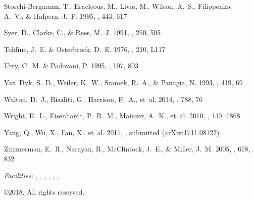 \documentclass[iop]{emulateapj}
\begin{document}
\begin{thebibliography}{84}
Storchi-Bergmann, T., Eracleous, M., Livio, M., Wilson, A.~S., Filippenko,
  A.~V., \& Halpern, J.~P. 1995, \apj, 443, 617

Syer, D., Clarke, C., \& Rees, M.~J. 1991, \mnras, 250, 505

Tohline, J.~E. \& Osterbrock, D.~E. 1976, \apjl, 210, L117

Urry, C.~M. \& Padovani, P. 1995, \pasp, 107, 803

{Van~Dyk}, S.~D., Weiler, K.~W., Sramek, R.~A., \& Panagia, N. 1993, \apj, 419,
  69

Walton, D.~J., Risaliti, G., Harrison, F.~A., {et~al.} 2014, \apj, 788, 76

Wright, E.~L., Eisenhardt, P.~R.~M., Mainzer, A.~K., {et~al.} 2010, \aj, 140,
  1868

Yang, Q., Wu, X., Fan, X., {et~al.} 2017, \apj, submitted (arXiv:1711.08122)

Zimmerman, E.~R., Narayan, R., McClintock, J.~E., \& Miller, J.~M. 2005, \apj,
  618, 832

\end{thebibliography}


\smallskip
{\it Facilities:} , , , ,  ,
, 

\smallskip
\copyright 2018.  All rights reserved.


\clearpage
\end{document}
